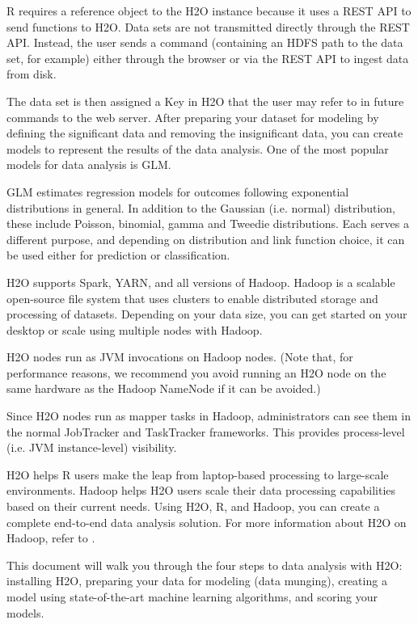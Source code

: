 \documentclass[11pt]{article}
\begin{document}
R requires a reference object to the H2O instance because it uses a REST API to send functions to H2O. Data sets are not transmitted directly through the REST API. Instead, the user sends a command (containing an HDFS path to the data set, for example) either through the browser or via the REST API to ingest data from disk.

The data set is then assigned a Key in H2O that the user may refer to in future commands to the web server. After preparing your dataset for modeling by defining the significant data and removing the insignificant data, you can create models to represent the results of the data analysis. One of the most popular models for data analysis is GLM. 

GLM estimates regression models for outcomes following exponential distributions in general. In addition to the Gaussian (i.e. normal) distribution, these include Poisson, binomial, gamma and Tweedie distributions. Each serves a different purpose, and depending on distribution and link function choice, it can be used either for prediction or classification.

H2O supports Spark, YARN, and all versions of Hadoop. Hadoop is a scalable open-source file system that uses clusters to enable distributed storage and processing of datasets. Depending on your data size, you can get started on your desktop or scale using multiple nodes with Hadoop. 

H2O nodes run as JVM invocations on Hadoop nodes. (Note that, for performance reasons, we recommend you avoid running an H2O node on the same hardware as the Hadoop NameNode if it can be avoided.)

Since H2O nodes run as mapper tasks in Hadoop, administrators can see them in the normal JobTracker and TaskTracker frameworks. This provides process-level (i.e. JVM instance-level) visibility.

H2O helps R users make the leap from laptop-based processing to large-scale environments. Hadoop helps H2O users scale their data processing capabilities based on their current needs. Using H2O, R, and Hadoop, you can create a complete end-to-end data analysis solution. For more information about H2O on Hadoop, refer to .

This document will walk you through the four steps to data analysis with H2O: installing H2O, preparing your data for modeling (data munging), creating a model using state-of-the-art machine learning algorithms, and scoring your models. 
\end{document}
